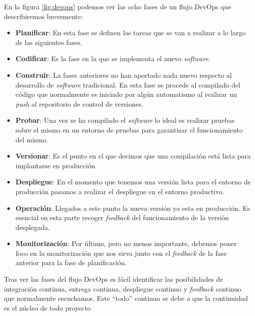 En la figura \ref{fig:devops} podemos ver las ocho fases de un flujo DevOps que describiremos brevemente: 

\begin{itemize}
\item \textbf{Planificar}:  En esta fase se definen las tareas que se van a realizar a lo largo de las siguientes fases. 

\item \textbf{Codificar}: Es la fase en la que se implementa el nuevo \textit{software}.

\item \textbf{Construir}: La fases anteriores no han aportado nada nuevo respecto al desarrollo de \textit{software} tradicional. En esta fase se procede al compilado del código que normalmente es iniciado por algún automatismo al realizar un \textit{push} al repositorio de control de versiones.

\item \textbf{Probar}: Una vez se ha compilado el \textit{software} lo ideal es realizar pruebas sobre el mismo en un entorno de pruebas para garantizar el funcionamiento del mismo.

\item \textbf{Versionar}: Es el punto en el que decimos que una compilación está lista para implantarse en producción. 

\item \textbf{Despliegue}: En el momento que tenemos una versión lista para el entorno de producción pasamos a realizar el despliegue en el entorno productivo.

\item \textbf{Operación}: Llegados a este punto la nueva versión ya esta en producción. Es esencial en esta parte recoger \textit{feedback} del funcionamiento de la versión desplegada.

\item \textbf{Monitorización}: Por último, pero no menos importante, debemos poner foco en la monitorización que nos sirva junto con el \textit{feedback} de la fase anterior para la fase de planificación.


 \end{itemize}


Tras ver las fases del flujo DevOps es fácil identificar las posibilidades de integración continua, entrega continua, despliegue continuo y \textit{feedback} continuo que normalmente escuchamos. Este ``todo'' continuo se debe a que la continuidad es el núcleo de todo proyecto 

